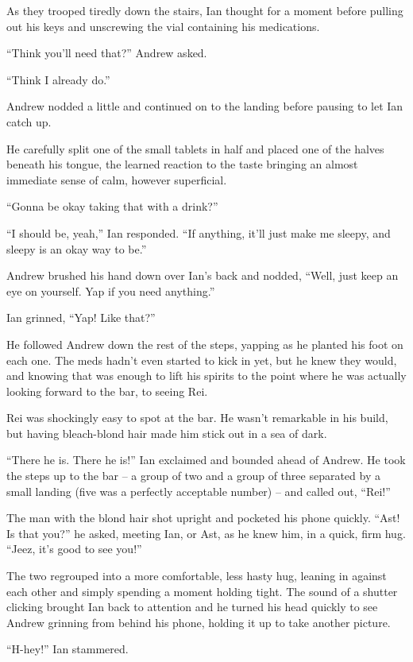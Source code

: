 As they trooped tiredly down the stairs, Ian thought for a moment before pulling out his keys and unscrewing the vial containing his medications.

``Think you'll need that?'' Andrew asked.

``Think I already do.''

Andrew nodded a little and continued on to the landing before pausing to let Ian catch up.

He carefully split one of the small tablets in half and placed one of the halves beneath his tongue, the learned reaction to the taste bringing an almost immediate sense of calm, however superficial.

``Gonna be okay taking that with a drink?''

``I should be, yeah,'' Ian responded. ``If anything, it'll just make me sleepy, and sleepy is an okay way to be.''

Andrew brushed his hand down over Ian's back and nodded, ``Well, just keep an eye on yourself. Yap if you need anything.''

Ian grinned, ``Yap! Like that?''

He followed Andrew down the rest of the steps, yapping as he planted his foot on each one. The meds hadn't even started to kick in yet, but he knew they would, and knowing that was enough to lift his spirits to the point where he was actually looking forward to the bar, to seeing Rei.

Rei was shockingly easy to spot at the bar. He wasn't remarkable in his build, but having bleach-blond hair made him stick out in a sea of dark.

``There he is. There he is!'' Ian exclaimed and bounded ahead of Andrew. He took the steps up to the bar -- a group of two and a group of three separated by a small landing (five was a perfectly acceptable number) -- and called out, ``Rei!''

The man with the blond hair shot upright and pocketed his phone quickly. ``Ast! Is that you?'' he asked, meeting Ian, or Ast, as he knew him, in a quick, firm hug. ``Jeez, it's good to see you!''

The two regrouped into a more comfortable, less hasty hug, leaning in against each other and simply spending a moment holding tight. The sound of a shutter clicking brought Ian back to attention and he turned his head quickly to see Andrew grinning from behind his phone, holding it up to take another picture.

``H-hey!'' Ian stammered.

